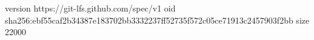 version https://git-lfs.github.com/spec/v1
oid sha256:ebf55caf2b34387e183702bb3332237ff52735f572c05ce71913c2457903f2bb
size 22000
